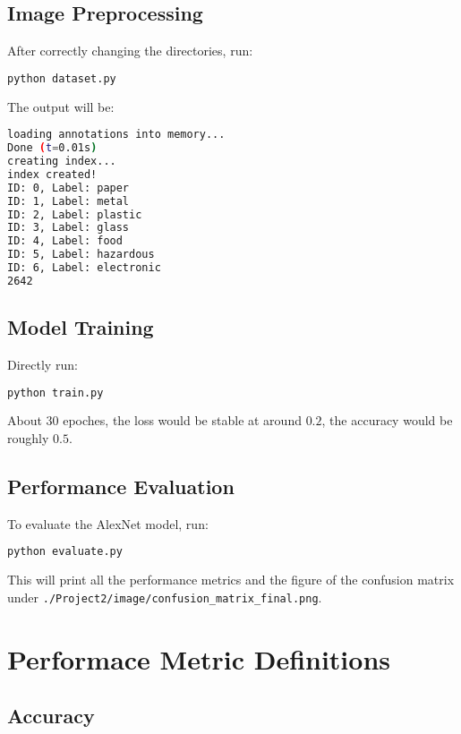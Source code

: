 \documentclass[a4paper,12pt]{article}
\begin{document}
\subsection{Image Preprocessing}

After correctly changing the directories, run:

\begin{lstlisting}[language=bash, style=custombash]
python dataset.py
\end{lstlisting}

The output will be:

\begin{lstlisting}[language=bash, style=custombash]
loading annotations into memory...
Done (t=0.01s)
creating index...
index created!
ID: 0, Label: paper
ID: 1, Label: metal
ID: 2, Label: plastic
ID: 3, Label: glass
ID: 4, Label: food
ID: 5, Label: hazardous
ID: 6, Label: electronic
2642
\end{lstlisting}

\subsection{Model Training}

Directly run:
\begin{lstlisting}[language=bash, style=custombash]
python train.py
\end{lstlisting}

About 30 epoches, the loss would be stable at around $0.2$, the accuracy would be roughly $0.5$.

\subsection{Performance Evaluation}

To evaluate the AlexNet model, run:
\begin{lstlisting}[language=bash, style=custombash]
python evaluate.py
\end{lstlisting}

This will print all the performance metrics and the figure of the confusion matrix under \texttt{./Project2/image/confusion\_matrix\_final.png}.


\section{Performace Metric Definitions}
\label{app:performance_metrics}

\subsection{Accuracy}
\end{document}
